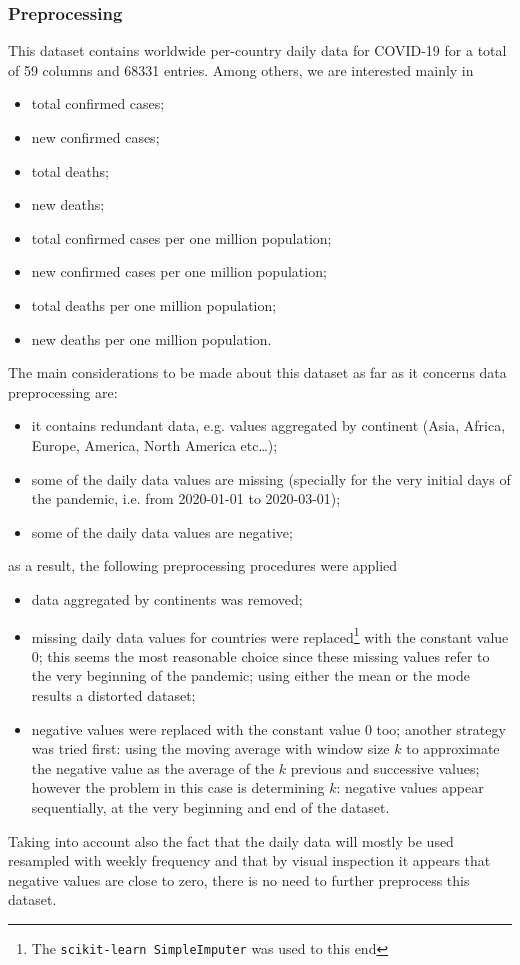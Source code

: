 \documentclass[11pt,a4paper]{article}
\begin{document}
\subsubsection{Preprocessing}
This dataset contains worldwide per-country daily data for COVID-19 for a total
of 59 columns and 68331 entries. Among others, we are interested mainly in
\begin{itemize}
    \item total confirmed cases;
    \item new confirmed cases;
    \item total deaths;
    \item new deaths;
    \item total confirmed cases per one million population;
    \item new confirmed cases per one million population;
    \item total deaths per one million population;
    \item new deaths per one million population.
\end{itemize}
The main considerations to be made about this dataset as far as it concerns data
preprocessing are:
\begin{itemize}
    \item it contains redundant data, e.g. values aggregated by continent (Asia,
    Africa, Europe, America, North America etc\dots);
    \item some of the daily data values are missing (specially for the very
    initial days of the pandemic, i.e. from 2020-01-01 to 2020-03-01);
    \item some of the daily data values are negative;
\end{itemize}
as a result, the following preprocessing procedures were applied
\begin{itemize}
    \item data aggregated by continents was removed;
    \item missing daily data values for countries were replaced\footnote{The
    \texttt{scikit-learn SimpleImputer} was used to this end} with the constant
    value $0$; this seems the most reasonable choice since these missing values
    refer to the very beginning of the pandemic; using either the mean or the
    mode results a distorted dataset;
    \item negative values were replaced with the constant value $0$ too; another
    strategy was tried first: using the moving average with window size $k$ to
    approximate the negative value as the average of the $k$ previous and
    successive values; however the problem in this case is determining $k$:
    negative values appear sequentially, at the very beginning and end of the
    dataset.
\end{itemize}
Taking into account also the fact that the daily data will mostly be used
resampled with weekly frequency and that by visual inspection it appears that
negative values are close to zero, there is no need to further preprocess this
dataset.
\end{document}
